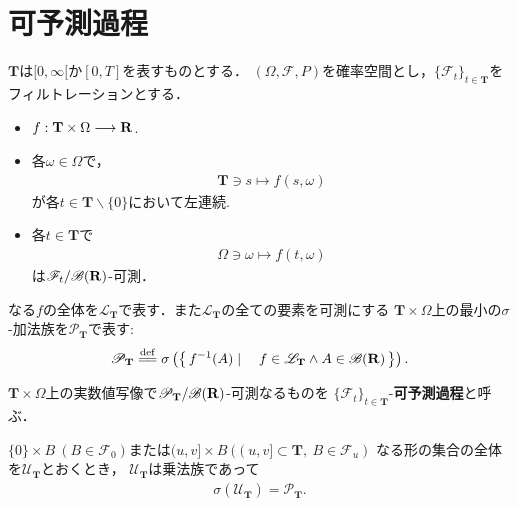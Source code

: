 \section{可予測過程}
	$\mathbf{T}$は$[0,\infty[$か$[0,T]$を表すものとする．
	$(\Omega, \mathscr{F}, P)$を確率空間とし，$\{\mathscr{F}_t\}_{t \in \mathbf{T}}$をフィルトレーションとする．
	
	\begin{itemize}
		\item $f:\mathbf{T} \times \Omega \longrightarrow \mathbf{R}$.
		
		\item 各$\omega \in \Omega$で，
			\begin{align}
				\mathbf{T} \ni s \longmapsto f(s,\omega)
			\end{align}
			が各$t \in \mathbf{T} \backslash \{0\}$において左連続.
			
		\item 各$t \in \mathbf{T}$で
			\begin{align}
				\Omega \ni \omega \longmapsto f(t,\omega)
			\end{align}
			は$\mathscr{F}_t/\mathscr{B}(\mathbf{R})$-可測．
	\end{itemize}
	
	なる$f$の全体を$\mathscr{L}_{\mathbf{T}}$で表す．また$\mathscr{L}_{\mathbf{T}}$の全ての要素を可測にする
	$\mathbf{T} \times \Omega$上の最小の$\sigma$-加法族を$\mathscr{P}_{\mathbf{T}}$で表す:
	\begin{align}
		\mathscr{P}_{\mathbf{T}} \defeq 
		\sigma\left(\Set{f^{-1}(A)}{f \in \mathscr{L}_{\mathbf{T}} \wedge A \in \borel{\R}}\right).
	\end{align}
	
	$\mathbf{T} \times \Omega$上の実数値写像で$\mathscr{P}_{\mathbf{T}}/\mathscr{B}(\mathbf{R})$-可測なるものを
	$\{\mathscr{F}_t\}_{t \in \mathbf{T}}$-{\bf 可予測過程}と呼ぶ．
	
	\begin{screen}
		\begin{thm}\label{thm:pi_system_generating_predictable_sets}
			$\{0\} \times B\ (B \in \mathscr{F}_0)$または$(u,v] \times B\ ((u,v] \subset \mathbf{T},\ B \in \mathscr{F}_u)$
			なる形の集合の全体を$\mathscr{U}_{\mathbf{T}}$とおくとき，
			$\mathscr{U}_{\mathbf{T}}$は乗法族であって
			\begin{align}
				\sigma\left(\mathscr{U}_{\mathbf{T}}\right) = \mathscr{P}_{\mathbf{T}}.
			\end{align}
		\end{thm}
	\end{screen}
	
